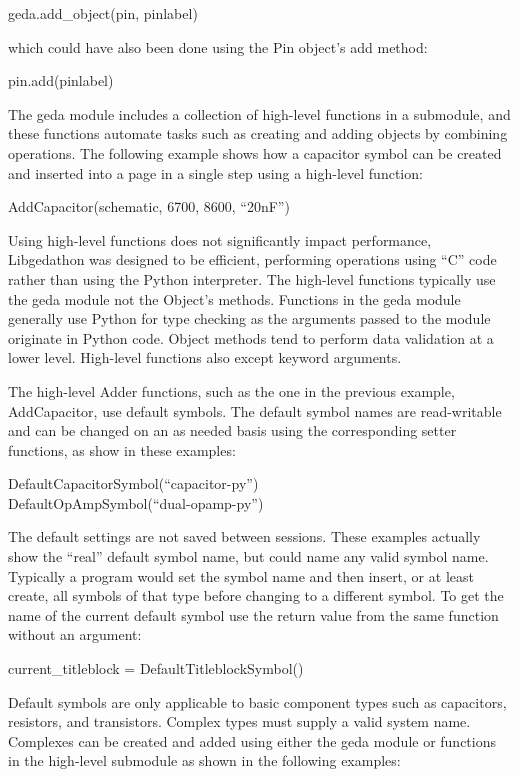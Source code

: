 geda.add\_object(pin, pinlabel)

  which could have also been done using the Pin object's add method:

pin.add(pinlabel)


  The geda module includes a collection of high-level functions in a submodule, and these functions automate tasks such as creating and adding objects by combining operations. The following example shows how a capacitor symbol can be created and inserted into a page in a single step using a high-level function:

AddCapacitor(schematic, 6700, 8600, ``20nF'')


  Using high-level functions does not significantly impact performance, Libgedathon was designed to be efficient, performing operations using ``C'' code rather than using the Python interpreter. The high-level functions typically use the geda module not the Object's methods. Functions in the geda module generally use Python for type checking as the arguments passed to the module originate in Python code. Object methods tend to perform data validation at a lower level. High-level functions also except keyword arguments.


  The high-level Adder functions, such as the one in the previous example, AddCapacitor, use default symbols. The default symbol names are read-writable and can be changed on an as needed basis using the corresponding setter functions, as show in these examples:

DefaultCapacitorSymbol(``capacitor-py'')
\\ 
DefaultOpAmpSymbol(``dual-opamp-py'')


  The default settings are not saved between sessions. These examples actually show the ``real'' default symbol name, but could name any valid symbol name. Typically a program would set the symbol name and then insert, or at least create, all symbols of that type before changing to a different symbol. To get the name of the current default symbol use the return value from the same function without an argument:

current\_titleblock = DefaultTitleblockSymbol()


  Default symbols are only applicable to basic component types such as capacitors, resistors, and transistors. Complex types must supply a valid system name. Complexes can be created and added using either the geda module or functions in the high-level submodule as shown in the following examples:

